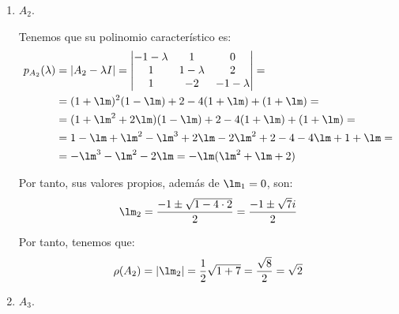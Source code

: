 \begin{ejercicio}
\begin{enumerate}
    \item $A_2$.
    
    Tenemos que su polinomio característico es:
    \begin{align*}
        p_{A_2}(\lambda) &= |A_2 - \lambda I| =
        \begin{vmatrix}
            -1-\lambda & 1 & 0\\
            1 & 1-\lambda & 2\\
            1 & -2 & -1-\lambda
        \end{vmatrix}
        =\\&=
        (1+\lm)^2(1-\lm) +2 -4(1+\lm) + (1+\lm) =\\&=
        (1+\lm^2+2\lm)(1-\lm) +2 -4(1+\lm) + (1+\lm) =\\&=
        1-\lm + \lm^2 - \lm^3 + 2\lm - 2\lm^2 + 2 - 4 - 4\lm + 1 + \lm =\\&=
        -\lm^3 - \lm^2 - 2\lm = -\lm(\lm^2 + \lm + 2)
    \end{align*}

    Por tanto, sus valores propios, además de $\lm_1 = 0$, son:
    \begin{equation*}
        \lm_2 = \frac{-1\pm \sqrt{1-4\cdot 2}}{2}
        = \frac{-1\pm \sqrt{7}i}{2}
    \end{equation*}

    Por tanto, tenemos que:
    \begin{equation*}
        \rho(A_2) = |\lm_2| = \frac{1}{2}\sqrt{1+7} = \frac{\sqrt{8}}{2} = \sqrt{2}
    \end{equation*}

    \item $A_3$.
    

\end{enumerate}
\end{ejercicio}
